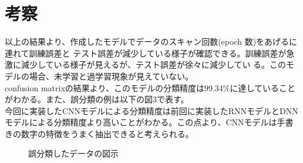 \documentclass{jarticle}
\begin{document}
\clearpage
\section{考察}
以上の結果より、作成したモデルでデータのスキャン回数(epoch 数)をあげるに連れて訓練誤差と テスト誤差が減少している様子が確認できる。訓練誤差が急 激に減少している様子が見えるが、テスト誤差が徐々に減少してい る。このモデルの場合、未学習と過学習現象が見えていない。\\
confusion matrixの結果より、このモデルの分類精度は99.34\%に達していることがわかる。また、誤分類の例は以下の図3で表す。\\
今回に実装したCNNモデルによる分類精度は前回に実装したRNNモデルとDNNモデルによる分類精度より高いことがわかる。この点より、CNNモデルは手書きの数字の特徴をうまく抽出できると考えられる。
\begin{figure}[h]
\centering
{}%
\qquad
{}%
\caption{誤分類したデータの図示}%
\label{fig:example}%
\end{figure}


\end{document}
